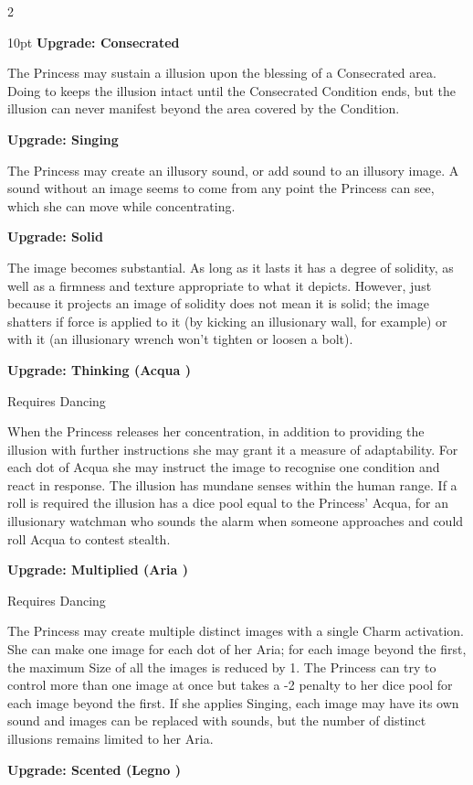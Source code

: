\begin{multicols}{2}
\begin{myindentpar}{10pt}
\textbf{Upgrade: Consecrated}

The Princess may sustain a illusion upon the blessing of a Consecrated area. Doing to keeps the illusion intact until the Consecrated Condition ends, but the illusion can never manifest beyond the area covered by the Condition. 

\textbf{Upgrade: Singing}

The Princess may create an illusory sound, or add sound to an illusory image. A sound without an image seems to come from any point the Princess can see, which she can move while concentrating.

\textbf{Upgrade: Solid}

The image becomes substantial. As long as it lasts it has a degree of solidity, as well as a firmness and texture appropriate to what it depicts. However, just because it projects an image of solidity does not mean it is solid; the image shatters if force is applied to it (by kicking an illusionary wall, for example) or with it (an illusionary wrench won't tighten or loosen a bolt).

\textbf{Upgrade: Thinking (Acqua \textbullet\textbullet)}

Requires Dancing

When the Princess releases her concentration, in addition to providing the illusion with further instructions she may grant it a measure of adaptability. For each dot of Acqua she may instruct the image to recognise one condition and react in response. The illusion has mundane senses within the human range. If a roll is required the illusion has a dice pool equal to the Princess' Acqua, for an illusionary watchman who sounds the alarm when someone approaches and could roll Acqua to contest stealth.

\textbf{Upgrade: Multiplied (Aria \textbullet\textbullet)}

Requires Dancing

The Princess may create multiple distinct images with a single Charm activation. She can make one image for each dot of her Aria; for each image beyond the first, the maximum Size of all the images is reduced by 1. The Princess can try to control more than one image at once but takes a -2 penalty to her dice pool for each image beyond the first. If she applies Singing, each image may have its own sound and images can be replaced with sounds, but the number of distinct illusions remains limited to her Aria.

\textbf{Upgrade: Scented (Legno \textbullet)}


\end{myindentpar}
\end{multicols}
